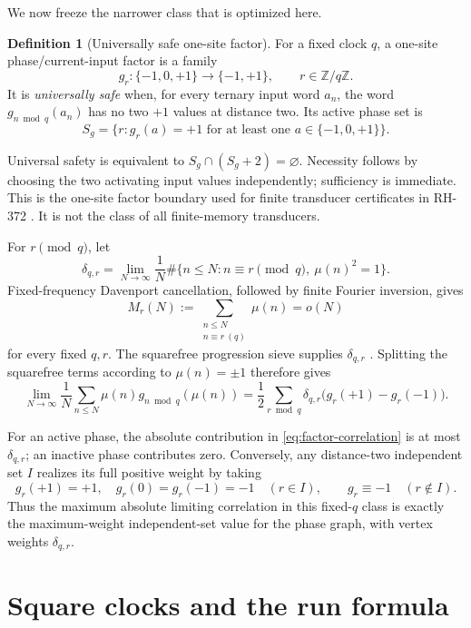 \documentclass[11pt]{article}
\theoremstyle{definition}
\newtheorem{definition}[theorem]{Definition}
\theoremstyle{remark}
\newcommand{\Mob}{\mu}
\newcommand{\Z}{\mathbb Z}
\newcommand{\dd}{\delta}
\begin{document}
We now freeze the narrower class that is optimized here.

\begin{definition}[Universally safe one-site factor]
For a fixed clock $q$, a one-site phase/current-input factor is a family
\[
       g_r:\{-1,0,+1\}\longrightarrow\{-1,+1\},
       \qquad r\in\Z/q\Z.
\]
It is \emph{universally safe} when, for every ternary input word $a_n$, the
word $g_{n\bmod q}(a_n)$ has no two $+1$ values at distance two.  Its active
phase set is
\[
       S_g=\{r:g_r(a)=+1\text{ for at least one }a\in\{-1,0,+1\}\}.
\]
\end{definition}

Universal safety is equivalent to $S_g\cap(S_g+2)=\varnothing$.  Necessity
follows by choosing the two activating input values independently; sufficiency
is immediate.  This is the one-site factor boundary used for finite
transducer certificates in RH-372 \cite{RH372}.  It is not the class of all
finite-memory transducers.

For $r\pmod q$, let
\[
 \dd_{q,r}=\lim_{N\to\infty}\frac1N
 \#\{n\le N:n\equiv r\pmod q,\ \Mob(n)^2=1\}.
\]
Fixed-frequency Davenport cancellation, followed by finite Fourier
inversion, gives
\[
 M_r(N):=\sum_{\substack{n\le N\\ n\equiv r\ (q)}}\Mob(n)=o(N)
\]
for every fixed $q,r$.
The squarefree progression sieve supplies $\dd_{q,r}$
\cite{Davenport1937,Mirsky1948}.  Splitting the squarefree terms according to
$\Mob(n)=\pm1$ therefore gives
\begin{equation}
 \lim_{N\to\infty}\frac1N\sum_{n\le N}
 \Mob(n)g_{n\bmod q}(\Mob(n))
 =\frac12\sum_{r\bmod q}\dd_{q,r}
       \bigl(g_r(+1)-g_r(-1)\bigr).
 \label{eq:factor-correlation}
\end{equation}

For an active phase, the absolute contribution in
\eqref{eq:factor-correlation} is at most $\dd_{q,r}$; an inactive phase
contributes zero.  Conversely, any distance-two independent set $I$ realizes
its full positive weight by taking
\begin{equation}
 g_r(+1)=+1,\quad g_r(0)=g_r(-1)=-1\quad(r\in I),
 \qquad g_r\equiv-1\quad(r\notin I).
 \label{eq:canonical-factor}
\end{equation}
Thus the maximum absolute limiting correlation in this fixed-$q$ class is
exactly the maximum-weight independent-set value for the phase graph, with
vertex weights $\dd_{q,r}$.

\section{Square clocks and the run formula}
\end{document}
